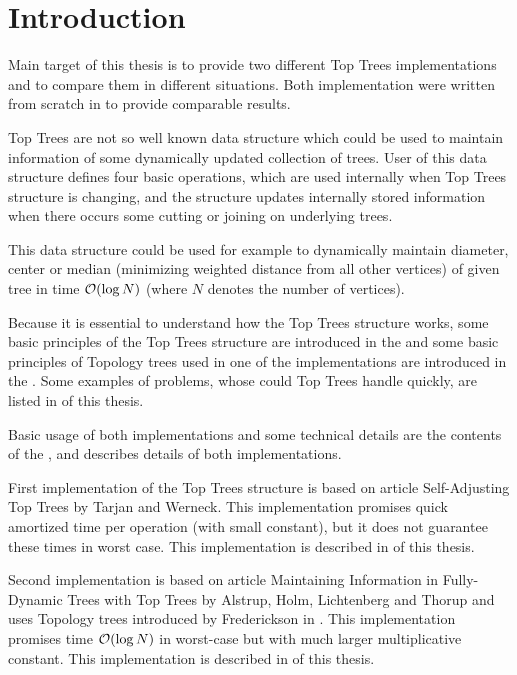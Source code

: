 \chapter*{Introduction}

Main target of this thesis is to provide two different {\I Top Trees}
implementations and to compare them in different situations. Both implementation
were written from scratch in \Cpp{} to provide comparable results.

{\I Top Trees} are not so well known data structure which could be used to
maintain information of some dynamically updated collection of trees. User of
this data structure defines four basic operations, which are used internally
when Top Trees structure is changing, and the structure updates internally
stored information when there occurs some cutting or joining on underlying
trees.

This data structure could be used for example to dynamically maintain diameter,
center or median (minimizing weighted distance from all other vertices) of given
tree in time ${\cal O}(\log N)$ (where $N$ denotes the number of vertices).

Because it is essential to understand how the Top Trees structure works, some
basic principles of the Top Trees structure are introduced in the
 and some basic principles of Topology trees used in one of
the implementations are introduced in the . Some
examples of problems, whose could Top Trees handle quickly, are listed in
 of this thesis.

Basic usage of both implementations and some technical details are the contents
of the ,  and
 describes details of both implementations.

First implementation of the Top Trees structure is based on article {\I
Self-Adjusting Top Trees} \cite{SelfAdjustingTT} by Tarjan and Werneck. This
implementation promises quick amortized time per operation (with small
constant), but it does not guarantee these times in worst case. This
implementation is described in  of this thesis.

Second implementation is based on article {\I Maintaining Information in Fully-
Dynamic Trees with Top Trees} \cite{TopTrees} by Alstrup, Holm, Lichtenberg and
Thorup and uses Topology trees introduced by Frederickson in
\cite{DSforDynamicallyMaintainingRootedTrees}. This implementation promises time
${\cal O}(\log N)$ in worst-case but with much larger multiplicative constant. This
implementation is described in  of this thesis.

